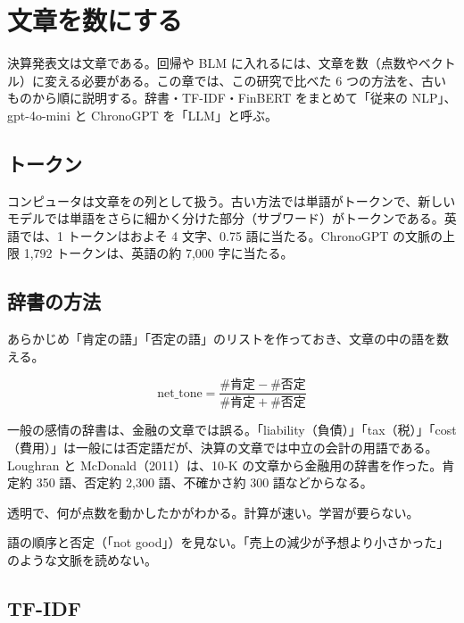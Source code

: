 \chapter{文章を数にする}\label{ch:text}

決算発表文は文章である。回帰や BLM に入れるには、文章を数（点数やベクトル）に変える必要がある。この章では、この研究で比べた 6 つの方法を、古いものから順に説明する。辞書・TF-IDF・FinBERT をまとめて「従来の NLP」、gpt-4o-mini と ChronoGPT を「LLM」と呼ぶ。

\section{トークン}

コンピュータは文章をの列として扱う。古い方法では単語がトークンで、新しいモデルでは単語をさらに細かく分けた部分（サブワード）がトークンである。英語では、1 トークンはおよそ 4 文字、0.75 語に当たる。ChronoGPT の文脈の上限 1,792 トークンは、英語の約 7,000 字に当たる。

\section{辞書の方法}

あらかじめ「肯定の語」「否定の語」のリストを作っておき、文章の中の語を数える。

\begin{equation}
\text{net\_tone} = \frac{\#\text{肯定} - \#\text{否定}}{\#\text{肯定} + \#\text{否定}}
\end{equation}

一般の感情の辞書は、金融の文章では誤る。「liability（負債）」「tax（税）」「cost（費用）」は一般には否定語だが、決算の文章では中立の会計の用語である。Loughran と McDonald（2011）は、10-K の文章から金融用の辞書を作った。肯定約 350 語、否定約 2,300 語、不確かさ約 300 語などからなる。

\begin{description}[leftmargin=1.5em,style=nextline]
\item[強み] 透明で、何が点数を動かしたかがわかる。計算が速い。学習が要らない。
\item[弱み] 語の順序と否定（「not good」）を見ない。「売上の減少が予想より小さかった」のような文脈を読めない。
\end{description}

\section{TF-IDF}

